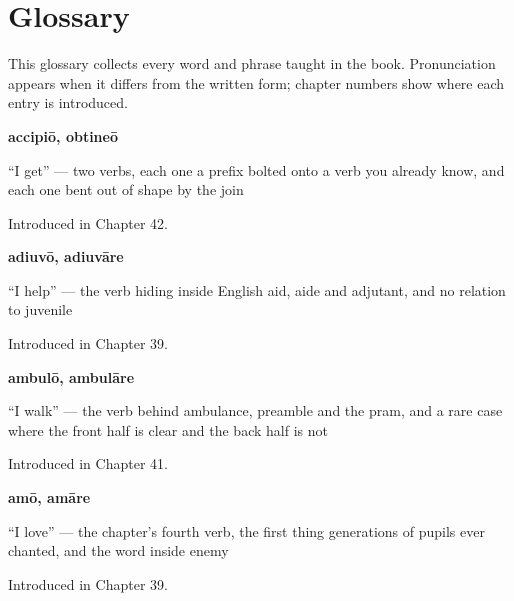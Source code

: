 
\chapter*{Glossary}

This glossary collects every word and phrase taught in the book. Pronunciation appears when it differs from the written form; chapter numbers show where each entry is introduced.

\noindent\begin{minipage}[t]{\linewidth}
\raggedright
\textbf{accipiō, obtineō}\par
\small \textquotedblleft{}I get\textquotedblright{} — two verbs, each one a prefix bolted onto a verb you already know, and each one bent out of shape by the join\par
\footnotesize Introduced in Chapter 42.
\end{minipage}\par\medskip

\noindent\begin{minipage}[t]{\linewidth}
\raggedright
\textbf{adiuvō, adiuvāre}\par
\small \textquotedblleft{}I help\textquotedblright{} — the verb hiding inside English aid, aide and adjutant, and no relation to juvenile\par
\footnotesize Introduced in Chapter 39.
\end{minipage}\par\medskip

\noindent\begin{minipage}[t]{\linewidth}
\raggedright
\textbf{ambulō, ambulāre}\par
\small \textquotedblleft{}I walk\textquotedblright{} — the verb behind ambulance, preamble and the pram, and a rare case where the front half is clear and the back half is not\par
\footnotesize Introduced in Chapter 41.
\end{minipage}\par\medskip

\noindent\begin{minipage}[t]{\linewidth}
\raggedright
\textbf{amō, amāre}\par
\small \textquotedblleft{}I love\textquotedblright{} — the chapter's fourth verb, the first thing generations of pupils ever chanted, and the word inside enemy\par
\footnotesize Introduced in Chapter 39.
\end{minipage}\par\medskip

